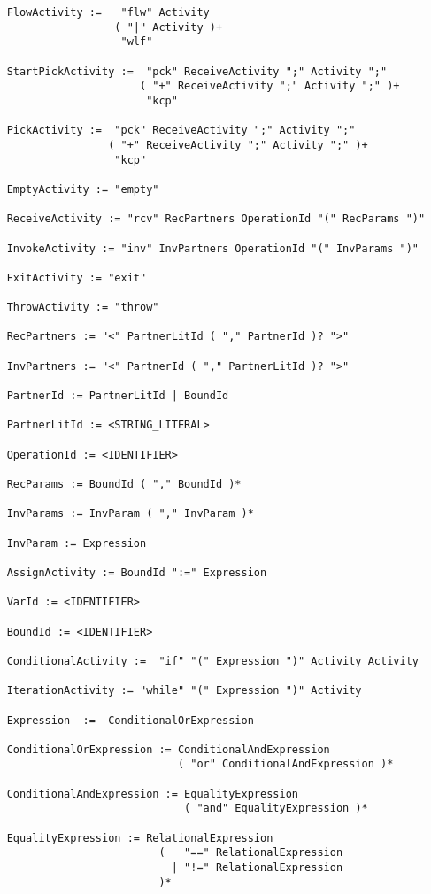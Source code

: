 \begin{verbatim}
	FlowActivity :=   "flw" Activity 
	                 ( "|" Activity )+ 
	                  "wlf"

	StartPickActivity :=  "pck" ReceiveActivity ";" Activity ";" 
	                     ( "+" ReceiveActivity ";" Activity ";" )+ 
	                      "kcp"

	PickActivity :=  "pck" ReceiveActivity ";" Activity ";" 
	                ( "+" ReceiveActivity ";" Activity ";" )+ 
	                 "kcp"	

	EmptyActivity := "empty"

	ReceiveActivity := "rcv" RecPartners OperationId "(" RecParams ")"

	InvokeActivity := "inv" InvPartners OperationId "(" InvParams ")"

	ExitActivity := "exit"

	ThrowActivity := "throw"

	RecPartners	:= "<" PartnerLitId ( "," PartnerId )? ">"

	InvPartners	:= "<" PartnerId ( "," PartnerLitId )? ">"

	PartnerId := PartnerLitId | BoundId 

	PartnerLitId :=	<STRING_LITERAL>

	OperationId := <IDENTIFIER>

	RecParams := BoundId ( "," BoundId )*

	InvParams := InvParam ( "," InvParam )*

	InvParam := Expression

	AssignActivity := BoundId ":=" Expression

	VarId := <IDENTIFIER>

	BoundId	:= <IDENTIFIER>

	ConditionalActivity	:=	"if" "(" Expression ")" Activity Activity

	IterationActivity := "while" "(" Expression ")" Activity

	Expression	:=	ConditionalOrExpression

	ConditionalOrExpression := ConditionalAndExpression 
	                           ( "or" ConditionalAndExpression )*

	ConditionalAndExpression := EqualityExpression 
	                            ( "and" EqualityExpression )*

	EqualityExpression := RelationalExpression 
	                        (   "==" RelationalExpression 
                              | "!=" RelationalExpression 
	                        )*


\end{verbatim}
